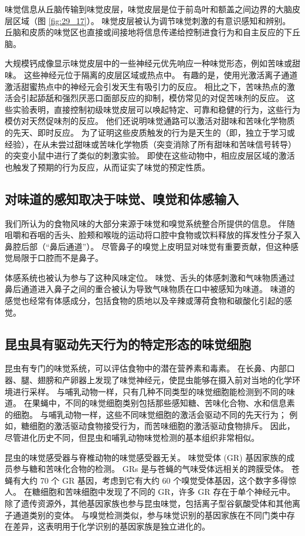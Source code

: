 味觉信息从丘脑传输到味觉皮层，味觉皮层是位于前岛叶和额盖之间边界的大脑皮层区域（图 \ref{fig:29_17}）。 味觉皮层被认为调节味觉刺激的有意识感知和辨别。 丘脑和皮质的味觉区也直接或间接地将信息传递给控制进食行为和自主反应的下丘脑。

大规模钙成像显示味觉皮层中的一些神经元优先响应一种味觉形态，例如苦味或甜味。 这些神经元位于隔离的皮层区域或热点中。 有趣的是，使用光激活离子通道激活甜蜜热点中的神经元会引发天生有吸引力的反应。 相比之下，苦味热点的激活会引起舔舐和强烈厌恶口面部反应的抑制，模仿常见的对促苦味剂的反应。 这些实验表明，直接控制初级味觉皮层可以唤起特定、可靠和稳健的行为，这些行为模仿对天然促味剂的反应。 他们还说明味觉通路可以激活对甜味和苦味化学物质的先天、即时反应。 为了证明这些皮质触发的行为是天生的（即，独立于学习或经验），在从未尝过甜味或苦味化学物质（突变消除了所有甜味和苦味信号转导）的突变小鼠中进行了类似的刺激实验。 即使在这些动物中，相应皮层区域的激活也触发了预期的行为反应，从而证实了味觉的预定性质。

\subsection{对味道的感知取决于味觉、嗅觉和体感输入}

我们所认为的食物风味的大部分来源于味觉和嗅觉系统整合所提供的信息。 伴随咀嚼和吞咽的舌头、脸颊和喉咙的运动将口腔中食物或饮料释放的挥发性分子泵入鼻腔后部（“鼻后通道”）。 尽管鼻子的嗅觉上皮明显对味觉有重要贡献，但这种感觉局限于口腔而不是鼻子。

体感系统也被认为参与了这种风味定位。 味觉、舌头的体感刺激和气味物质通过鼻后通道进入鼻子之间的重合被认为导致气味物质在口中被感知为味道。 味道的感觉也经常有体感成分，包括食物的质地以及辛辣或薄荷食物和碳酸化引起的感觉。


\subsection{昆虫具有驱动先天行为的特定形态的味觉细胞}

昆虫有专门的味觉系统，可以评估食物中的潜在营养素和毒素。 在长鼻、内部口器、腿、翅膀和产卵器上发现了味觉神经元，使昆虫能够在摄入前对当地的化学环境进行采样。 与哺乳动物一样，只有几种不同类型的味觉细胞能检测到不同的味道。 在果蝇中，不同的味觉细胞类别包括那些感知糖、苦味化合物、水和信息素的细胞。 与哺乳动物一样，这些不同味觉细胞的激活会驱动不同的先天行为； 例如，糖细胞的激活驱动食物接受行为，而苦味细胞的激活驱动食物排斥。 因此，尽管进化历史不同，但昆虫和哺乳动物味觉检测的基本组织非常相似。

昆虫的味觉感受器与脊椎动物的味觉感受器无关。 味觉受体 (GR) 基因家族的成员参与糖和苦味化合物的检测。 GRs 是与苍蝇的气味受体远相关的跨膜受体。 苍蝇有大约 70 个 GR 基因，考虑到它有大约 60 个嗅觉受体基因，这个数字多得惊人。 在糖细胞和苦味细胞中发现了不同的 GR，许多 GR 存在于单个神经元中。 除了遗传资源外，其他基因家族也参与昆虫味觉，包括离子型谷氨酸受体和其他离子通道类别的变体。 与嗅觉检测类似，参与味觉识别的基因家族在不同门类中存在差异，这表明用于化学识别的基因家族是独立进化的。

